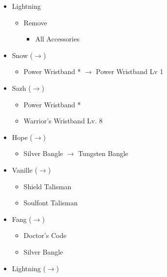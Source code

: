 \begin{paracol}{2}
\begin{menu}
\begin{itemize}
		\end{itemize}
	\end{menu}
	\switchcolumn
	\begin{menu}
\begin{itemize}
    \equip
    \begin{itemize}
        \item Lightning
        \begin{itemize}
            \item Remove
            \begin{itemize}
                \item All Accessories
            \end{itemize}
        \end{itemize}
        \item Snow ($\rightarrow$)
            \begin{itemize}
                \item Power Wristband * $\rightarrow$ Power Wristband Lv 1
            \end{itemize}
        \item Sazh ($\rightarrow$)
        \begin{itemize}
                \item Power Wristband *
                \item Warrior's Wristband Lv. 8
            \end{itemize}
        \item Hope ($\rightarrow$)
            \begin{itemize}
                \item Silver Bangle $\rightarrow$ Tungsten Bangle
            \end{itemize}
        \item Vanille ($\rightarrow$)
        \begin{itemize}
                \item Shield Talisman
                \item Soulfont Talisman
        \end{itemize}
        \item Fang ($\rightarrow$)
            \begin{itemize}
                \item Doctor's Code
                \item Silver Bangle
        \end{itemize}
        \item Lightning ($\rightarrow$)
        \begin{itemize}

\end{itemize}
\end{itemize}
\end{itemize}
\end{menu}
\end{paracol}
